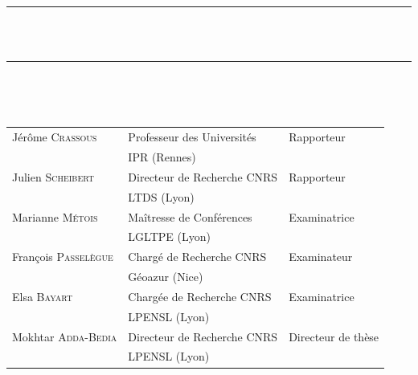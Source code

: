 \begin{titlepage}
	\vspace{10pt}
	
	\begin{center}
		\noindent\rule{16cm}{0.25pt}\\
		\vspace{10pt}
		{\THETITLE } \\
		\noindent\rule{16cm}{0.25pt}\\
	\end{center}
	\vfill 
	
	
	 \\
	
	\noindent \begin{tabular}{p{}p{}p{}}
		Jérôme \textsc {Crassous} & 
			Professeur des Universités & 
			Rapporteur
		\\
			&
			IPR (Rennes)  & \\
		Julien \textsc {Scheibert} & Directeur de Recherche CNRS & Rapporteur\\
		& LTDS (Lyon) & \\
		Marianne \textsc {Métois} &  Maîtresse de Conférences & Examinatrice \\
		& LGLTPE (Lyon)& \\
		François \textsc {Passelègue} & Chargé de Recherche CNRS & Examinateur\\
		& Géoazur (Nice) & \\
		Elsa \textsc {Bayart} & Chargée de Recherche CNRS & Examinatrice\\
		& LPENSL (Lyon) &\\
		Mokhtar \textsc {Adda-Bedia} & Directeur de Recherche CNRS & Directeur de thèse\\
		& LPENSL (Lyon) &
	\end{tabular}
	
\end{titlepage}

\restoregeometry 
